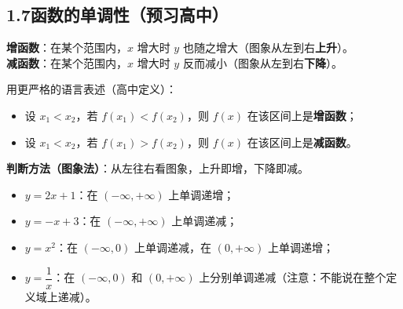 \documentclass[12pt, a4paper]{ctexart}
\begin{document}
\begin{center}
\end{center}

\subsection*{1.7\quad 函数的单调性（预习高中）}

\begin{knowledgebox}
\textbf{增函数}：在某个范围内，$x$ 增大时 $y$ 也随之增大（图象从左到右\textbf{上升}）。\\
\textbf{减函数}：在某个范围内，$x$ 增大时 $y$ 反而减小（图象从左到右\textbf{下降}）。

用更严格的语言表述（高中定义）：
\begin{itemize}[leftmargin=2em]
  \item 设 $x_1 < x_2$，若 $f(x_1) < f(x_2)$，则 $f(x)$ 在该区间上是\textbf{增函数}；
  \item 设 $x_1 < x_2$，若 $f(x_1) > f(x_2)$，则 $f(x)$ 在该区间上是\textbf{减函数}。
\end{itemize}

\textbf{判断方法（图象法）}：从左往右看图象，上升即增，下降即减。
\end{knowledgebox}

\begin{tipbox}[常见函数的单调性]
\begin{itemize}[leftmargin=2em]
  \item $y = 2x + 1$：在 $(-\infty, +\infty)$ 上单调递增；
  \item $y = -x + 3$：在 $(-\infty, +\infty)$ 上单调递减；
  \item $y = x^2$：在 $(-\infty, 0)$ 上单调递减，在 $(0, +\infty)$ 上单调递增；
  \item $y = \dfrac{1}{x}$：在 $(-\infty, 0)$ 和 $(0, +\infty)$ 上分别单调递减（注意：不能说在整个定义域上递减）。
\end{itemize}
\end{tipbox}
\end{document}
